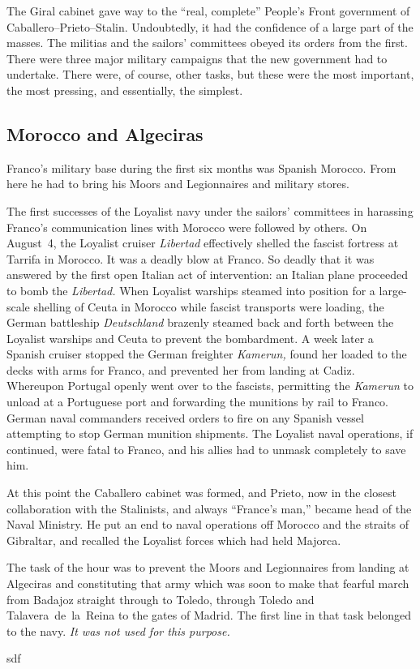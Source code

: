 \indexLCaballero\indexIPrieto{}
The Giral cabinet gave way to the ``real, complete'' People’s Front government of Caballero--Prieto--Stalin. Undoubtedly, it had the confidence of a large part of the masses. The militias and the sailors’ committees obeyed its orders from the first. There were three major military campaigns that the new government had to undertake. There were, of course, other tasks, but these were the most important, the most pressing, and essentially, the simplest.

\subsection*{Morocco and Algeciras}

\indexFFranco{}
Franco’s military base during the first six months was Spanish Morocco. From here he had to bring his Moors and Legionnaires and military stores.

The first successes of the Loyalist navy under the sailors’ committees in harassing Franco’s communication lines with Morocco were followed by others. On August~4, the Loyalist cruiser \emph{Libertad} effectively shelled the fascist fortress at Tarrifa in Morocco. It was a deadly blow at Franco. So deadly that it was answered by the first open Italian act of intervention: an Italian plane proceeded to bomb the \emph{Libertad.} When Loyalist warships steamed into position for a large-scale shelling of Ceuta in Morocco while fascist transports were loading, the German battleship \emph{Deutschland} brazenly steamed back and forth between the Loyalist warships and Ceuta to prevent the bombardment. A week later a Spanish cruiser stopped the German freighter \emph{Kamerun,} found her loaded to the decks with arms for Franco, and prevented her from landing at Cadiz. Whereupon Portugal openly went over to the fascists, permitting the \emph{Kamerun} to unload at a Portuguese port and forwarding the munitions by rail to Franco. German naval commanders received orders to fire on any Spanish vessel attempting to stop German munition shipments. The Loyalist naval operations, if continued, were fatal to Franco, and his allies had to unmask completely to save him.

\indexLCaballero\indexIPrieto{}
At this point the Caballero cabinet was formed, and Prieto, now in the closest collaboration with the Stalinists, and always ``France’s man,'' became head of the Naval Ministry. He put an end to naval operations off Morocco and the straits of Gibraltar, and recalled the Loyalist forces which had held Majorca.

The task of the hour was to prevent the Moors and Legionnaires from landing at Algeciras and constituting that army which was soon to make that fearful march from Badajoz straight through to Toledo, through Toledo and Talavera~de~la~Reina to the gates of Madrid. The first line in that task belonged to the navy. \emph{It was not used for this purpose.}
\nowidow

sdf